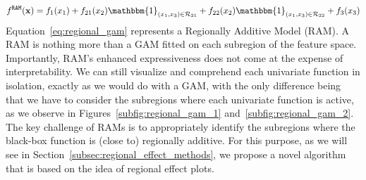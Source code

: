 \documentclass[12pt]{article}
\newcommand{\xb}{\mathbf{x}}
\newcommand{\when}[1]{\mathbbm{1}_{#1}}
\begin{document}
\begin{equation}
    \label{eq:regional_gam}
    f^{\mathtt{RAM}}(\xb) = f_1(x_1) + f_{21}(x_2) \when{(x_1, x_3) \in \mathcal{R}_{21}} + f_{22}(x_2) \when{(x_1, x_3) \in \mathcal{R}_{22}} + f_3(x_3)
\end{equation}
%
Equation~\eqref{eq:regional_gam} represents a Regionally Additive Model (RAM). A RAM is nothing more than a GAM fitted on each subregion of the feature space.
Importantly, RAM's enhanced expressiveness does not come at the expense of interpretability.
We can still visualize and comprehend each univariate function in isolation, exactly as we would do with a GAM,
with the only difference being that we have to consider the subregions where each univariate function is active, as we observe in
Figures~\ref{subfig:regional_gam_1} and~\ref{subfig:regional_gam_2}.
The key challenge of RAMs is to appropriately identify the subregions where the black-box function is (close to) regionally additive.
For this purpose, as we will see in Section~\ref{subsec:regional_effect_methods}, we propose a novel algorithm that is based on the idea of
regional effect plots.
\end{document}
